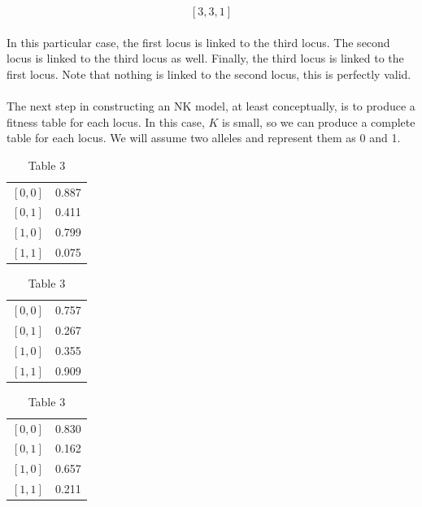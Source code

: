 \documentclass[12pt,letterpaper,titlepage]{article}
\begin{document}
\begin{displaymath}
    \left[3,3,1\right]
\end{displaymath}

\paragraph{}
In this particular case, the first locus is linked to the third locus. The
second locus is linked to the third locus as well. Finally, the third locus is
linked to the first locus. Note that nothing is linked to the second locus,
this is perfectly valid.

\paragraph{}
The next step in constructing an NK model, at least conceptually, is to produce
a fitness table for each locus. In this case, $K$ is small, so we can produce a
complete table for each locus. We will assume two alleles and represent them as
0 and 1.

\begin{table}
    \captionsetup{labelformat=empty}
    \parbox{.3\linewidth}{\centering
        \begin{tabular}{l l}
            $\left[0, 0\right]$ & 0.887 \\
            $\left[0, 1\right]$ & 0.411 \\
            $\left[1, 0\right]$ & 0.799 \\
            $\left[1, 1\right]$ & 0.075 \\
        \end{tabular}
        \caption{Table 1}
    }
    \parbox{.3\linewidth}{\centering
        \begin{tabular}{l l}
            $\left[0, 0\right]$ & 0.757 \\
            $\left[0, 1\right]$ & 0.267 \\
            $\left[1, 0\right]$ & 0.355 \\
            $\left[1, 1\right]$ & 0.909 \\
        \end{tabular}
        \caption{Table 2}
    }
    \parbox{.3\linewidth}{\centering
        \begin{tabular}{l l}
            $\left[0, 0\right]$ & 0.830 \\
            $\left[0, 1\right]$ & 0.162 \\
            $\left[1, 0\right]$ & 0.657 \\
            $\left[1, 1\right]$ & 0.211 \\
        \end{tabular}
        \caption{Table 3}
    }
\end{table}
\end{document}
